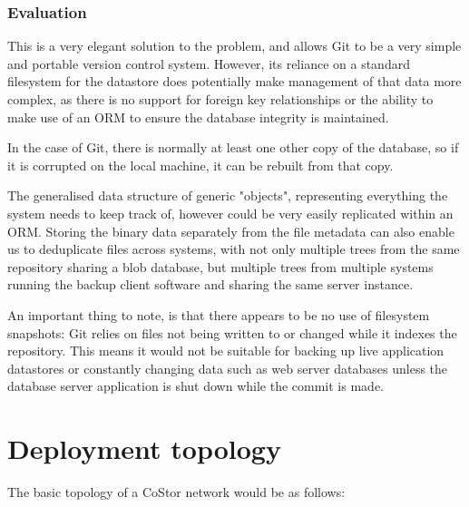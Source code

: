 \documentclass[bsc,frontabs,twoside,singlespacing,parskip,deptreport]{infthesis}     %
\begin{document}
\subsubsection{Evaluation}

This is a very elegant solution to the problem, and allows Git to be a very simple and portable
version control system. However, its reliance on a standard filesystem for the datastore does
potentially make management of that data more complex, as there is no support for foreign key 
relationships or the ability to make use of an ORM to ensure the database integrity is maintained.

In the case of Git, there is normally at least one other copy of the database, so if it is 
corrupted on the local machine, it can be rebuilt from that copy.

The generalised data structure of generic "objects", representing everything the system needs to
keep track of, however could be very easily replicated within an ORM. Storing the binary data
separately from the file metadata can also enable us to deduplicate files across systems, with 
not only multiple trees from the same repository sharing a blob database, but multiple trees from
multiple systems running the backup client software and sharing the same server instance.

An important thing to note, is that there appears to be no use of filesystem snapshots: Git
relies on files not being written to or changed while it indexes the repository. This means it
would not be suitable for backing up live application datastores or constantly changing data
such as web server databases unless the database server application is shut down while the 
commit is made.

\section{Deployment topology}

The basic topology of a CoStor network would be as follows:
\end{document}
